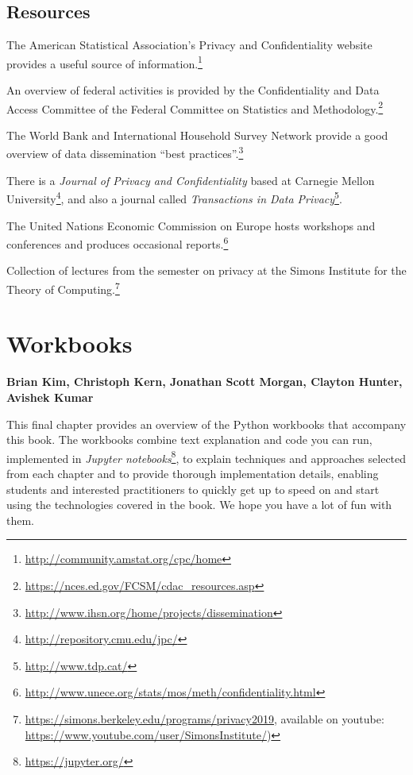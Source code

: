 \documentclass[]{krantz}
\begin{document}
\section{Resources}\label{resources-6}

The American Statistical Association's Privacy and Confidentiality
website provides a useful source of information.\footnote{\url{http://community.amstat.org/cpc/home}}

An overview of federal activities is provided by the Confidentiality and
Data Access Committee of the Federal Committee on Statistics and
Methodology.\footnote{\url{https://nces.ed.gov/FCSM/cdac_resources.asp}}

The World Bank and International Household Survey Network provide a good
overview of data dissemination ``best practices''.\footnote{\url{http://www.ihsn.org/home/projects/dissemination}}

There is a \emph{Journal of Privacy and Confidentiality} based at
Carnegie Mellon University\footnote{\url{http://repository.cmu.edu/jpc/}},
and also a journal called \emph{Transactions in Data Privacy}\footnote{\url{http://www.tdp.cat/}}.

The United Nations Economic Commission on Europe hosts workshops and
conferences and produces occasional reports.\footnote{\url{http://www.unece.org/stats/mos/meth/confidentiality.html}}

Collection of lectures from the semester on privacy at the Simons
Institute for the Theory of Computing.\footnote{\url{https://simons.berkeley.edu/programs/privacy2019},
  available on youtube:
  \url{https://www.youtube.com/user/SimonsInstitute/})}

\hypertarget{chap:workbooks}{\chapter{Workbooks}\label{chap:workbooks}}

\textbf{Brian Kim, Christoph Kern, Jonathan Scott Morgan, Clayton
Hunter, Avishek Kumar}

This final chapter provides an overview of the Python workbooks that
accompany this book. The workbooks combine text explanation and code you
can run, implemented in \emph{Jupyter notebooks}\footnote{\url{https://jupyter.org/}},
to explain techniques and approaches selected from each chapter and to
provide thorough implementation details, enabling students and
interested practitioners to quickly get up to speed on and start using
the technologies covered in the book. We hope you have a lot of fun with
them.
\end{document}

